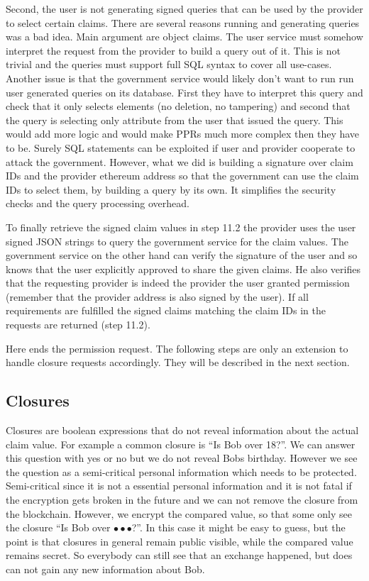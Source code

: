 Second, the user is not generating signed queries that can be used by the provider to select certain claims. There are several reasons running and generating queries was a bad idea. Main argument are object claims. The user service must somehow interpret the request from the provider to build a query out of it. This is not trivial and the queries must support full SQL syntax to cover all use-cases. Another issue is that the government service would likely don’t want to run run user generated queries on its database. First they have to interpret this query and check that it only selects elements (no deletion, no tampering) and second that the query is selecting only attribute from the user that issued the query. 
This would add more logic and would make PPRs much more complex then they have to be. Surely SQL statements can be exploited if user and provider cooperate to attack the government.
However, what we did is building a signature over claim IDs and the provider ethereum address so that the government can use the claim IDs to select them, by building a query by its own. It simplifies the security checks and the query processing overhead. 

To finally retrieve the signed claim values in step 11.2 the provider uses the user signed JSON strings to query the government service for the claim values. The government service on the other hand can verify the signature of the user and so knows that the user explicitly approved to share the given claims. He also verifies that the requesting provider is indeed the provider the user granted permission (remember that the provider address is also signed by the user). If all requirements are fulfilled the signed claims matching the claim IDs in the requests are returned (step 11.2).

Here ends the permission request. The following steps are only an extension to handle closure requests accordingly. They will be described in the next section.     

\subsection{Closures}
\label{sec:closure}
Closures are boolean expressions that do not reveal information about the actual claim value. For example a common closure is “Is Bob over 18?”. We can answer this question with yes or no but we do not reveal Bobs birthday. However we see the question as a semi-critical personal information which needs to be protected. Semi-critical since it is not a essential personal information and it is not fatal if the encryption gets broken in the future and we can not remove the closure from the blockchain. However, we encrypt the compared value, so that some only see the closure “Is Bob over $\bullet\bullet\bullet$?”. In this case it might be easy to guess, but the point is that closures in general remain public visible, while the compared value remains secret. So everybody can still see that an exchange happened, but does can not gain any new information about Bob. 

